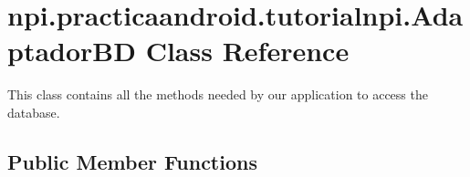 \hypertarget{classnpi_1_1practicaandroid_1_1tutorialnpi_1_1_adaptador_b_d}{\section{npi.\-practicaandroid.\-tutorialnpi.\-Adaptador\-B\-D Class Reference}
\label{classnpi_1_1practicaandroid_1_1tutorialnpi_1_1_adaptador_b_d}
}


This class contains all the methods needed by our application to access the database.  


\subsection*{Public Member Functions}
